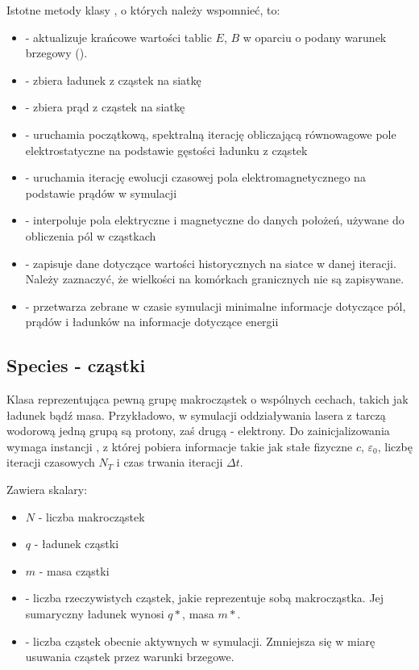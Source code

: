 Istotne metody klasy , o których należy wspomnieć, to:
\begin{itemize}
     \item {} - aktualizuje krańcowe wartości tablic $E$, $B$
         w oparciu o podany warunek brzegowy ().
     \item {} - zbiera ładunek z cząstek na siatkę
     \item {} - zbiera prąd z cząstek na siatkę
     \item {} - uruchamia początkową, spektralną iterację obliczającą równowagowe
           pole elektrostatyczne na podstawie gęstości ładunku z cząstek
     \item {} - uruchamia iterację ewolucji czasowej pola elektromagnetycznego na podstawie
           prądów w symulacji
     \item {} - interpoluje pola elektryczne i magnetyczne do danych położeń, używane
           do obliczenia pól w cząstkach
     \item {} - zapisuje dane dotyczące wartości historycznych na siatce w danej iteracji.
           Należy zaznaczyć, że wielkości na komórkach granicznych nie są zapisywane.
     \item {} - przetwarza zebrane w czasie symulacji minimalne informacje dotyczące pól, prądów i ładunków
           na informacje dotyczące energii
\end{itemize}

\subsection{Species - cząstki}
Klasa reprezentująca pewną grupę makrocząstek o wspólnych cechach, takich
jak ładunek bądź masa.  Przykładowo, w symulacji oddziaływania lasera z
tarczą wodorową jedną grupą są protony, zaś drugą - elektrony.  Do
zainicjalizowania wymaga instancji , z której pobiera informacje
takie jak stałe fizyczne $c$, $\varepsilon_0$, liczbę iteracji czasowych
$N_T$ i czas trwania iteracji $\Delta t$.

Zawiera skalary:
\begin{itemize}
    \item $N$ - liczba makrocząstek
    \item $q$ - ładunek cząstki
    \item $m$ - masa cząstki
    \item {} - liczba rzeczywistych cząstek, jakie reprezentuje
        sobą makrocząstka. Jej sumaryczny ładunek wynosi $q *
        $, masa $m * $.
    \item {} - liczba cząstek obecnie aktywnych w symulacji.
        Zmniejsza się w miarę usuwania cząstek przez warunki brzegowe.
\end{itemize}

